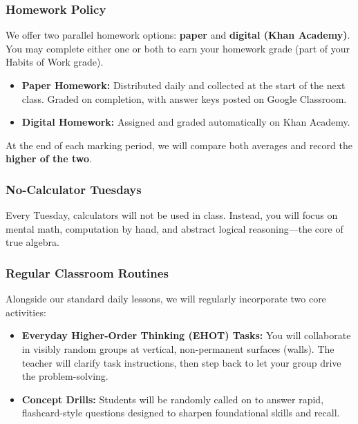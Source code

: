 \documentclass[10pt, aspectratio=169]{beamer}
\begin{document}
\begin{frame}
\frametitle{Homework Policy}
We offer two parallel homework options: \textbf{paper} and \textbf{digital (Khan Academy)}. You may complete either one or both to earn your homework grade (part of your Habits of Work grade).

\begin{itemize}
    \item \textbf{Paper Homework:} Distributed daily and collected at the start of the next class. Graded on completion, with answer keys posted on Google Classroom.
    \item \textbf{Digital Homework:} Assigned and graded automatically on Khan Academy.
\end{itemize}

At the end of each marking period, we will compare both averages and record the \textbf{\color{red}higher of the two}.
\end{frame}

\begin{frame}
\frametitle{No-Calculator Tuesdays}
Every Tuesday, calculators will not be used in class. Instead, you will focus on mental math, computation by hand, and abstract logical reasoning---the core of true algebra.
\end{frame}

\begin{frame}
\frametitle{Regular Classroom Routines}
Alongside our standard daily lessons, we will regularly incorporate two core activities:
\vspace{0.5em}

\begin{itemize}
    \item \textbf{Everyday Higher-Order Thinking (EHOT) Tasks:} You will collaborate in visibly random groups at vertical, non-permanent surfaces (walls). The teacher will clarify task instructions, then step back to let your group drive the problem-solving.
    \item \textbf{Concept Drills:} Students will be randomly called on to answer rapid, flashcard-style questions designed to sharpen foundational skills and recall.
\end{itemize}
\end{frame}
\end{document}
